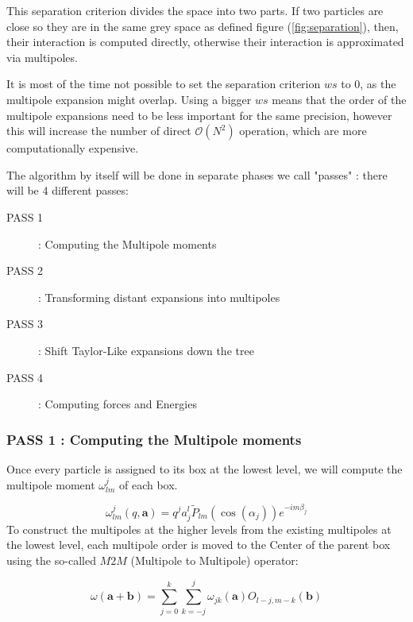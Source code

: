 \documentclass[12pt,twoside,a4paper]{report}
\begin{document}
		This separation criterion divides the space into two parts. If two particles are close so they are in the same grey space as defined figure (\ref{fig:separation}), then, their interaction is computed directly, otherwise their interaction is approximated via multipoles.
	
	It is most of the time not possible to set the separation criterion $ws$ to 0, as the multipole expansion might overlap. Using a bigger $ws$ means that the order of the multipole expansions need to be less important for the same precision, however this will increase the number of direct $\mathcal{O}(N^2)$ operation, which are  more computationally expensive.       
    
    
	The algorithm by itself will be done in separate phases we call "passes" : there will be 4 different passes:
	
	\begin{description}
	\item[PASS 1] : Computing the Multipole moments
	\item[PASS 2] : Transforming distant expansions into multipoles
	\item[PASS 3] : Shift Taylor-Like expansions down the tree
	\item[PASS 4] : Computing forces and Energies
	
	\end{description}
		
	
	    
    
    
    \subsubsection{PASS 1 : Computing the Multipole moments}
    
    Once every particle is assigned to its box at the lowest level, we will compute the multipole moment $\omega_{lm}^j$ of each box.
    
    \begin{equation}
    \omega_{lm}^{j}(q,\textbf{a}) = q^j a_j^l \widetilde{P}_{lm}(\cos(\alpha_j))e^{-im\beta_j}
    \end{equation}
%
To construct the multipoles at the higher levels from the existing multipoles at the lowest level, each multipole order is moved to the Center of the parent box using the so-called $M2M$ (Multipole to Multipole) operator:    
    
    \begin{equation}
    \omega(\textbf{a} + \textbf{b}) = \sum\limits_{j=0}^{k} \sum\limits_{k=-j}^{j} \omega_{jk}(\textbf{a}) O_{l-j,m-k}(\textbf{b})
    \end{equation}
\end{document}
